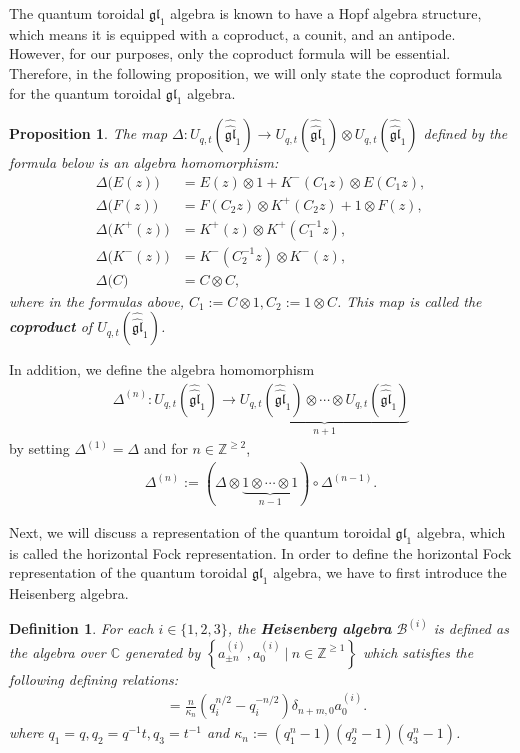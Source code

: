 \documentclass[12pt,reqno,a4paper]{amsart}
\newcommand{\comp}{\circ}
\newcommand{\tens}{\otimes}
\newcommand{\cals}[1]{\mathcal{#1}}
\newcommand{\fraks}[1]{\mathfrak{#1}}
\newcommand{\bb}[1]{\mathbb{#1}}
\numberwithin{equation}{section}
\newtheorem{prop}[thm]{Proposition}
\newtheorem{dfn}[thm]{Definition}
\theoremstyle{definition}
\begin{document}
The quantum toroidal $\fraks{gl}_1$ algebra is known to have a Hopf algebra structure, which means it is equipped with a coproduct, a counit, and an antipode. However, for our purposes, only the coproduct formula will be essential. Therefore, in the following proposition, we will only state the coproduct formula for the quantum toroidal $\fraks{gl}_1$ algebra. 

\begin{prop}
The map $\Delta : U_{q,t}(\widehat{\widehat{\fraks{gl}}}_1)
\rightarrow 
U_{q,t}(\widehat{\widehat{\fraks{gl}}}_1) \tens U_{q,t}(\widehat{\widehat{\fraks{gl}}}_1)$ defined by the formula below is an algebra homomorphism:
\begin{align}
	\Delta\big(E(z)\big) &= E(z) \tens 1 + K^-(C_1z) \tens E(C_1z),
	\label{copro1}
	\\
	\Delta\big(F(z)\big) &= F(C_2z) \tens K^+(C_2z) + 1 \tens F(z),
	\\
	\Delta\big(K^+(z)\big) &= K^+(z) \tens K^+(C_1^{-1}z),
	\\
	\Delta\big(K^-(z)\big) &= K^-(C_2^{-1}z) \tens K^-(z),
	\label{copro4}
	\\
	\Delta\big(		C		\big) &= C \tens C, 
\end{align}
where in the formulas above, $C_1 := C \tens 1, C_2 := 1 \tens C$. This map is called the \textbf{coproduct} of $U_{q,t}(\widehat{\widehat{\fraks{gl}}}_1)$. 
\end{prop}

In addition, we define the algebra homomorphism
\begin{align}
\Delta^{(n)} : U_{q,t}(\widehat{\widehat{\fraks{gl}}}_1)
\rightarrow 
\underbrace{	U_{q,t}(\widehat{\widehat{\fraks{gl}}}_1) \tens \cdots \tens U_{q,t}(\widehat{\widehat{\fraks{gl}}}_1)		}_{n+1}
\label{eqn219-1142-6aug}
\end{align}
by setting $\Delta^{(1)} = \Delta$ and for $n \in \bb{Z}^{\geq 2}$, 
\begin{align}
	\Delta^{(n)} := (\Delta \tens \underbrace{		1 \tens \cdots \tens 1		}_{n-1} ) \comp \Delta^{(n-1)}. 
\label{eqn220-1142-6aug}
\end{align}

Next, we will discuss a representation of the quantum toroidal $\fraks{gl}_1$ algebra, which is called the horizontal Fock representation. In order to define the horizontal Fock representation of the quantum toroidal $\fraks{gl}_1$ algebra, we have to first introduce the Heisenberg algebra. 

\begin{dfn}
For each $i \in \{1,2,3\}$, the \textbf{Heisenberg algebra} $\cals{B}^{(i)}$ is defined as the algebra over $\bb{C}$ generated by $\left\{a^{(i)}_{\pm n}, a^{(i)}_0~|~ n \in \bb{Z}^{\geq 1}\right\}$ which satisfies the following defining relations: 
\begin{align}
	[a_n^{(i)},a_m^{(i)}] &= \frac{n}{\kappa_n}(q_i^{n/2} - q_i^{-n/2})
	\delta_{n+m,0}a^{(i)}_0. 
\label{eqn221-1222-6aug}
\end{align}
where $q_1 = q, q_2 = q^{-1}t, q_3 = t^{-1}$
and $\kappa_n := (q^n_1 - 1)(q^n_2 - 1)(q^n_3 - 1)$. 
\end{dfn}
\end{document}

